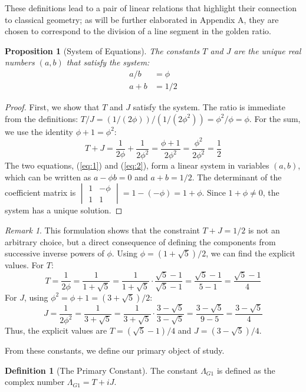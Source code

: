 \documentclass{amsart}
\theoremstyle{plain}
\newtheorem{proposition}[theorem]{Proposition}
\theoremstyle{definition}
\newtheorem{definition}[theorem]{Definition}
\theoremstyle{remark}
\newtheorem*{remark}{Remark}
\newcommand{\LambdaG}{\Lambda_{G1}}
\newcommand{\phiG}{\phi}
\begin{document}
These definitions lead to a pair of linear relations that highlight their connection to classical geometry; as will be further elaborated in Appendix A, they are chosen to correspond to the division of a line segment in the golden ratio.
\begin{proposition}[System of Equations]
The constants $T$ and $J$ are the unique real numbers $(a,b)$ that satisfy the system:
\begin{align}
    a/b &= \phiG \label{eq:1} \\
    a+b &= 1/2 \label{eq:2}
\end{align}
\end{proposition}
\begin{proof}
First, we show that $T$ and $J$ satisfy the system. The ratio is immediate from the definitions: $T/J = (1/(2\phiG))/(1/(2\phiG^2)) = \phiG^2/\phiG = \phiG$. For the sum, we use the identity $\phiG+1 = \phiG^2$:
\[ T+J = \frac{1}{2\phiG} + \frac{1}{2\phiG^2} = \frac{\phiG+1}{2\phiG^2} = \frac{\phiG^2}{2\phiG^2} = \frac{1}{2} \]
The two equations, (\ref{eq:1}) and (\ref{eq:2}), form a linear system in variables $(a,b)$, which can be written as $a - \phiG b = 0$ and $a+b=1/2$. The determinant of the coefficient matrix is $\begin{vmatrix} 1 & -\phiG \\ 1 & 1 \end{vmatrix} = 1 - (-\phiG) = 1+\phiG$. Since $1+\phiG \neq 0$, the system has a unique solution.
\end{proof}

\begin{remark}
This formulation shows that the constraint $T+J=1/2$ is not an arbitrary choice, but a direct consequence of defining the components from successive inverse powers of $\phiG$. Using $\phiG = (1+\sqrt{5})/2$, we can find the explicit values. For $T$:
\[ T = \frac{1}{2\phiG} = \frac{1}{1+\sqrt{5}} = \frac{1}{1+\sqrt{5}} \cdot \frac{\sqrt{5}-1}{\sqrt{5}-1} = \frac{\sqrt{5}-1}{5-1} = \frac{\sqrt{5}-1}{4} \]
For $J$, using $\phiG^2 = \phiG+1 = (3+\sqrt{5})/2$:
\[ J = \frac{1}{2\phiG^2} = \frac{1}{3+\sqrt{5}} = \frac{1}{3+\sqrt{5}} \cdot \frac{3-\sqrt{5}}{3-\sqrt{5}} = \frac{3-\sqrt{5}}{9-5} = \frac{3-\sqrt{5}}{4} \]
Thus, the explicit values are $T = (\sqrt{5}-1)/4$ and $J = (3-\sqrt{5})/4$.
\end{remark}

From these constants, we define our primary object of study.
\begin{definition}[The Primary Constant]
The constant $\LambdaG$ is defined as the complex number $\LambdaG = T+iJ$.
\end{definition}
\end{document}
